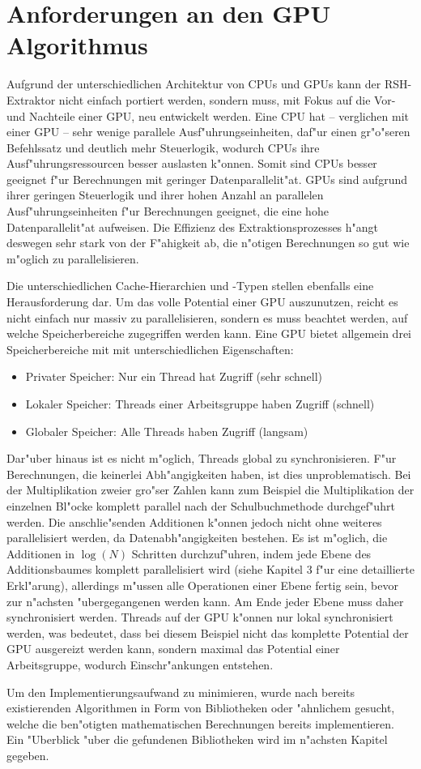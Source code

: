 \section{Anforderungen an den GPU Algorithmus}

Aufgrund der unterschiedlichen Architektur von CPUs und GPUs kann der RSH-Extraktor nicht einfach portiert werden, sondern muss, mit Fokus auf die Vor- und Nachteile einer GPU, neu entwickelt werden. Eine CPU hat -- verglichen mit einer GPU -- sehr wenige parallele Ausf"uhrungseinheiten, daf"ur einen gr"o"seren Befehlssatz und deutlich mehr Steuerlogik, wodurch CPUs ihre Ausf"uhrungsressourcen besser auslasten k"onnen. Somit sind CPUs besser geeignet f"ur Berechnungen mit geringer Datenparallelit"at. GPUs sind aufgrund ihrer geringen Steuerlogik und ihrer hohen Anzahl an parallelen Ausf"uhrungseinheiten f"ur Berechnungen geeignet, die eine hohe Datenparallelit"at aufweisen. Die Effizienz des Extraktionsprozesses h"angt deswegen sehr stark von der F"ahigkeit ab, die n"otigen Berechnungen so gut wie m"oglich zu parallelisieren. 

Die unterschiedlichen Cache-Hierarchien und -Typen stellen ebenfalls eine Herausforderung dar. Um das volle Potential einer GPU auszunutzen, reicht es nicht einfach nur massiv zu parallelisieren, sondern es muss beachtet werden, auf welche Speicherbereiche zugegriffen werden kann. Eine GPU bietet allgemein drei Speicherbereiche mit mit unterschiedlichen Eigenschaften:
\begin{itemize}
	\item Privater Speicher: Nur ein Thread hat Zugriff (sehr schnell)
	\item Lokaler Speicher: Threads einer Arbeitsgruppe haben Zugriff (schnell)
	\item Globaler Speicher: Alle Threads haben Zugriff (langsam)
\end{itemize}
Dar"uber hinaus ist es nicht m"oglich, Threads global zu synchronisieren. F"ur Berechnungen, die keinerlei Abh"angigkeiten haben, ist dies unproblematisch. Bei der Multiplikation zweier gro"ser Zahlen kann zum Beispiel die Multiplikation der einzelnen Bl"ocke komplett parallel nach der Schulbuchmethode durchgef"uhrt werden. Die anschlie"senden Additionen k"onnen jedoch nicht ohne weiteres parallelisiert werden, da Datenabh"angigkeiten bestehen. Es ist m"oglich, die Additionen in $\log(N)$ Schritten durchzuf"uhren, indem jede Ebene des Additionsbaumes komplett parallelisiert wird (siehe \cite{haque2012plain} Kapitel 3 f"ur eine detaillierte Erkl"arung), allerdings m"ussen alle Operationen einer Ebene fertig sein, bevor zur n"achsten "ubergegangenen werden kann. Am Ende jeder Ebene muss daher synchronisiert werden. Threads auf der GPU k"onnen nur lokal synchronisiert werden, was bedeutet, dass bei diesem Beispiel nicht das komplette Potential der GPU ausgereizt werden kann, sondern maximal das Potential einer Arbeitsgruppe, wodurch Einschr"ankungen entstehen.

Um den Implementierungsaufwand zu minimieren, wurde nach bereits existierenden Algorithmen in Form von Bibliotheken oder "ahnlichem gesucht, welche die ben"otigten mathematischen Berechnungen bereits implementieren. Ein "Uberblick "uber die gefundenen Bibliotheken wird im n"achsten Kapitel gegeben.
